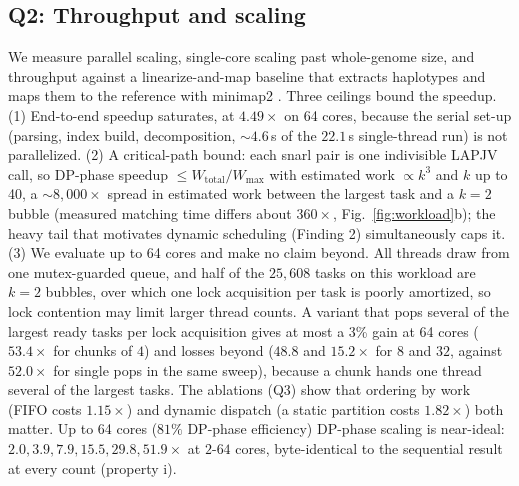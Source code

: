 \subsection{Q2: Throughput and scaling}
We measure parallel scaling, single-core scaling past whole-genome size, and throughput against a linearize-and-map baseline that extracts haplotypes and maps them to the reference with minimap2 \cite{li2018minimap2}. Three ceilings bound the speedup. (1) End-to-end speedup saturates, at $4.49\times$ on 64 cores, because the serial set-up (parsing, index build, decomposition, ${\sim}4.6$\,s of the $22.1$\,s single-thread run) is not parallelized. (2) A critical-path bound: each snarl pair is one indivisible LAPJV call, so DP-phase speedup $\le W_{\text{total}}/W_{\max}$ with estimated work $\propto k^3$ and $k$ up to 40, a ${\sim}8{,}000\times$ spread in estimated work between the largest task and a $k{=}2$ bubble (measured matching time differs about $360\times$, Fig.~\ref{fig:workload}b); the heavy tail that motivates dynamic scheduling (Finding 2) simultaneously caps it. (3) We evaluate up to 64 cores and make no claim beyond. All threads draw from one mutex-guarded queue, and half of the $25{,}608$ tasks on this workload are $k{=}2$ bubbles, over which one lock acquisition per task is poorly amortized, so lock contention may limit larger thread counts. A variant that pops several of the largest ready tasks per lock acquisition gives at most a 3\% gain at 64 cores ($53.4\times$ for chunks of $4$) and losses beyond ($48.8$ and $15.2\times$ for $8$ and $32$, against $52.0\times$ for single pops in the same sweep), because a chunk hands one thread several of the largest tasks. The ablations (Q3) show that ordering by work (FIFO costs $1.15\times$) and dynamic dispatch (a static partition costs $1.82\times$) both matter. Up to 64 cores ($81\%$ DP-phase efficiency) DP-phase scaling is near-ideal: $2.0,3.9,7.9,15.5,29.8,51.9\times$ at $2$-$64$ cores, byte-identical to the sequential result at every count (property i).

